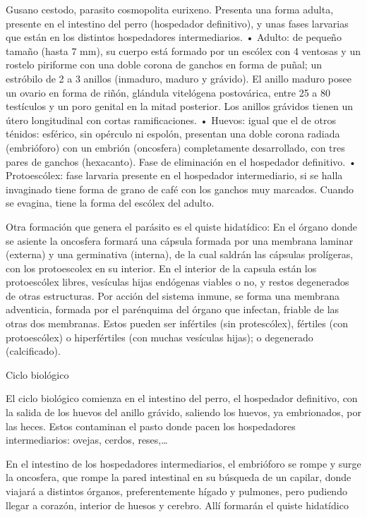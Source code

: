 Gusano cestodo, parasito cosmopolita eurixeno. Presenta una forma adulta, presente en el intestino del perro (hospedador definitivo), y unas fases larvarias que están en los distintos hospedadores intermediarios.
• Adulto: de pequeño tamaño (hasta 7 mm), su cuerpo está formado por un escólex con 4 ventosas y un rostelo piriforme con una doble corona de ganchos en forma de puñal; un estróbilo de 2 a 3 anillos (inmaduro, maduro y grávido). El anillo maduro posee un ovario en forma de riñón, glándula vitelógena postovárica, entre 25 a 80 testículos y un poro genital en la mitad posterior. Los anillos grávidos tienen un útero longitudinal con cortas ramificaciones.
• Huevos: igual que el de otros ténidos: esférico, sin opérculo ni espolón, presentan una doble corona radiada (embrióforo) con un embrión (oncosfera) completamente desarrollado, con tres pares de ganchos (hexacanto). Fase de eliminación en el hospedador definitivo.
• Protoescólex: fase larvaria presente en el hospedador intermediario, si se halla invaginado tiene forma de grano de café con los ganchos muy marcados. Cuando se evagina, tiene la forma del escólex del adulto.

Otra formación que genera el parásito es el quiste hidatídico: En el órgano donde se asiente la oncosfera formará una cápsula formada por una membrana laminar (externa) y una germinativa (interna), de la cual saldrán las cápsulas prolígeras, con los protoescolex en su interior. En el interior de la capsula están los protoescólex libres, vesículas hijas endógenas viables o no, y restos degenerados de otras estructuras. Por acción del sistema inmune, se forma una membrana adventicia, formada por el parénquima del órgano que infectan, friable de las otras dos membranas. Estos pueden ser infértiles (sin protescólex), fértiles (con protoescólex) o hiperfértiles (con muchas vesículas hijas); o degenerado (calcificado).

Ciclo biológico

El ciclo biológico comienza en el intestino del perro, el hospedador definitivo, con la salida de los huevos del anillo grávido, saliendo los huevos, ya embrionados, por las heces. Estos contaminan el pasto donde pacen los hospedadores intermediarios: ovejas, cerdos, reses,…

En el intestino de los hospedadores intermediarios, el embrióforo se rompe y surge la oncosfera, que rompe la pared intestinal en su búsqueda de un capilar, donde viajará a distintos órganos, preferentemente hígado y pulmones, pero pudiendo llegar a corazón, interior de huesos y cerebro. Allí formarán el quiste hidatídico

